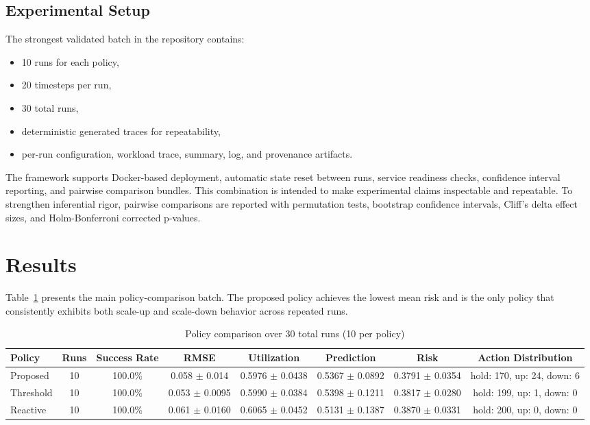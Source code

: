 \documentclass[conference]{IEEEtran}
\begin{document}
\subsection{Experimental Setup}
The strongest validated batch in the repository contains:
\begin{itemize}[leftmargin=*]
\item 10 runs for each policy,
\item 20 timesteps per run,
\item 30 total runs,
\item deterministic generated traces for repeatability,
\item per-run configuration, workload trace, summary, log, and provenance artifacts.
\end{itemize}

The framework supports Docker-based deployment, automatic state reset between runs, service readiness checks, confidence interval reporting, and pairwise comparison bundles. This combination is intended to make experimental claims inspectable and repeatable.
To strengthen inferential rigor, pairwise comparisons are reported with permutation tests, bootstrap confidence intervals, Cliff's delta effect sizes, and Holm-Bonferroni corrected p-values.

\section{Results}
Table~\ref{tab:policy-results} presents the main policy-comparison batch. The proposed policy achieves the lowest mean risk and is the only policy that consistently exhibits both scale-up and scale-down behavior across repeated runs.

\begin{table}[!t]
\caption{Policy comparison over 30 total runs (10 per policy)}
\label{tab:policy-results}
\centering
\footnotesize
\begin{tabular}{lccccccc}
\toprule
\textbf{Policy} & \textbf{Runs} & \textbf{Success Rate} & \textbf{RMSE} & \textbf{Utilization} & \textbf{Prediction} & \textbf{Risk} & \textbf{Action Distribution} \\
\midrule
Proposed & 10 & 100.0\% & 0.058 $\pm$ 0.014 & 0.5976 $\pm$ 0.0438 & 0.5367 $\pm$ 0.0892 & 0.3791 $\pm$ 0.0354 & hold: 170, up: 24, down: 6 \\
Threshold & 10 & 100.0\% & 0.053 $\pm$ 0.0095 & 0.5990 $\pm$ 0.0384 & 0.5398 $\pm$ 0.1211 & 0.3817 $\pm$ 0.0280 & hold: 199, up: 1, down: 0 \\
Reactive & 10 & 100.0\% & 0.061 $\pm$ 0.0160 & 0.6065 $\pm$ 0.0452 & 0.5131 $\pm$ 0.1387 & 0.3870 $\pm$ 0.0331 & hold: 200, up: 0, down: 0 \\
\bottomrule
\end{tabular}
\end{table}
\end{document}
